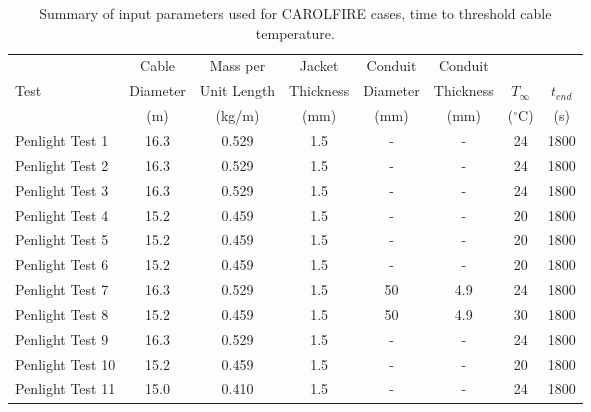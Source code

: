 \begin{table}[!ht]
\caption[Input parameters for CAROLFIRE cases, time to threshold cable temperature]
{Summary of input parameters used for CAROLFIRE cases, time to threshold cable temperature.}

\begin{center}
\begin{tabular}{|l|c|c|c|c|c|c|c|}
\hline
                  &  Cable     &  Mass per     &  Jacket     &  Conduit   &  Conduit    &               &             \\
Test              &  Diameter  &  Unit Length  &  Thickness  &  Diameter  &  Thickness  &  $T_\infty$   &  $t_{end}$  \\
                  &  (m)       &  (kg/m)       &  (mm)       &  (mm)      &  (mm)       &  ($^\circ$C)  &  (s)        \\ \hline \hline
Penlight Test 1   &  16.3      &  0.529        &  1.5        &  -         &  -          &  24           &  1800       \\ \hline
Penlight Test 2   &  16.3      &  0.529        &  1.5        &  -         &  -          &  24           &  1800       \\ \hline
Penlight Test 3   &  16.3      &  0.529        &  1.5        &  -         &  -          &  24           &  1800       \\ \hline
Penlight Test 4   &  15.2      &  0.459        &  1.5        &  -         &  -          &  20           &  1800       \\ \hline
Penlight Test 5   &  15.2      &  0.459        &  1.5        &  -         &  -          &  20           &  1800       \\ \hline
Penlight Test 6   &  15.2      &  0.459        &  1.5        &  -         &  -          &  20           &  1800       \\ \hline
Penlight Test 7   &  16.3      &  0.529        &  1.5        &  50        &  4.9        &  24           &  1800       \\ \hline
Penlight Test 8   &  15.2      &  0.459        &  1.5        &  50        &  4.9        &  30           &  1800       \\ \hline
Penlight Test 9   &  16.3      &  0.529        &  1.5        &  -         &  -          &  24           &  1800       \\ \hline
Penlight Test 10  &  15.2      &  0.459        &  1.5        &  -         &  -          &  20           &  1800       \\ \hline
Penlight Test 11  &  15.0      &  0.410        &  1.5        &  -         &  -          &  24           &  1800       \\ \hline

\end{tabular}
\end{center}
\end{table}
